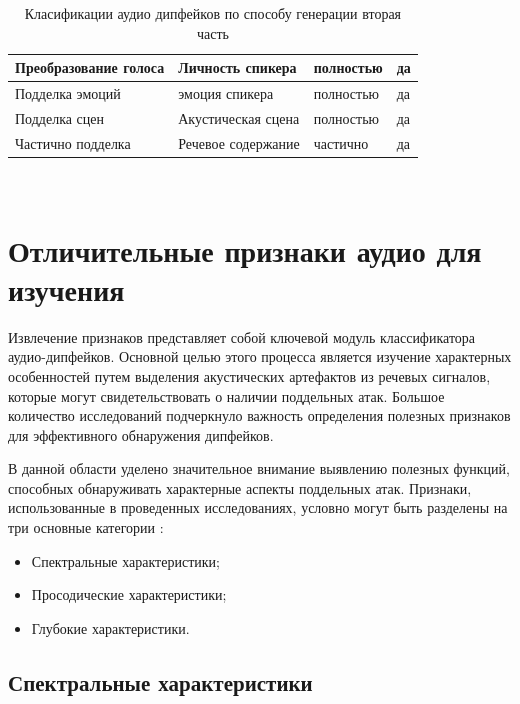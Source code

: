 \begin{table}[H]
	\centering
	\setlength{\tabcolsep}{8pt} %
	\renewcommand{\arraystretch}{1.3} %
    \caption{Класификации аудио дипфейков по способу генерации вторая часть}\label{tab:class}
    \captionsetup{justification=raggedright,singlelinecheck=false}
    \begin{tabular}{|p{4cm}|p{3cm}|p{4cm}|p{3cm}|}	   
		\hline
        Преобразование голоса   & Личность спикера & полностью  &  да \\
		\hline
		Подделка эмоций & эмоция спикера 	& полностью  &  да \\
		\hline
		Подделка сцен  & Акустическая сцена & полностью  &  да \\
		\hline
		Частично подделка  & Речевое содержание 	& частично  &  да \\
		\hline
    \end{tabular}
    \label{table::audio-class}
\end{table}\\

\vspace{12pt}
{\let\clearpage\relax \chapter{Отличительные признаки аудио для изучения}}

Извлечение признаков представляет собой ключевой модуль классификатора аудио-дипфейков. Основной целью этого процесса является изучение характерных особенностей путем выделения акустических артефактов из речевых сигналов, которые могут свидетельствовать о наличии поддельных атак. Большое количество исследований подчеркнуло важность определения полезных признаков для эффективного обнаружения дипфейков.

В данной области уделено значительное внимание выявлению полезных функций, способных обнаруживать характерные аспекты поддельных атак. Признаки, использованные в проведенных исследованиях, условно могут быть разделены на три основные категории \cite{sahidullah2015comparison}: 

\begin{itemize}
    \item Спектральные характеристики;
    \item Просодические характеристики;
    \item Глубокие характеристики.
\end{itemize}

\section{Спектральные характеристики}

